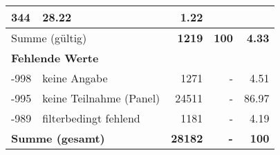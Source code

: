 \begin{longtable}{lXrrr}
       \num{344} &
       \num[round-mode=places,round-precision=2]{28.22} &
         \num[round-mode=places,round-precision=2]{1.22} \\
     \midrule
     \multicolumn{2}{l}{Summe (gültig)} &
       \textbf{\num{1219}} &
     \textbf{100} &
       \textbf{\num[round-mode=places,round-precision=2]{4.33}} \\
     \multicolumn{5}{l}{\textbf{Fehlende Werte}}\\
       -998 &
       keine Angabe &
         \num{1271} &
        - &
         \num[round-mode=places,round-precision=2]{4.51} \\
       -995 &
       keine Teilnahme (Panel) &
         \num{24511} &
        - &
         \num[round-mode=places,round-precision=2]{86.97} \\
       -989 &
       filterbedingt fehlend &
         \num{1181} &
        - &
         \num[round-mode=places,round-precision=2]{4.19} \\
     \midrule
     \multicolumn{2}{l}{\textbf{Summe (gesamt)}} &
          \textbf{\num{28182}} &
        \textbf{-} &
        \textbf{100} \\
     \bottomrule
     \end{longtable}
     
